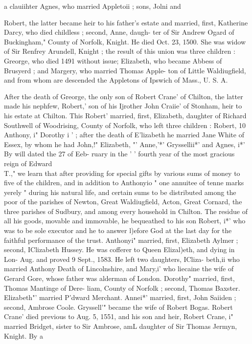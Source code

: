 \documentclass[oneside]{book}
\begin{document}
a clauiihter Agnes, who married Appletoii ; sons, Jolni and 

Robert, the latter became heir to his father's estate and married, 
first, Katherine Darcy, who died childless ; second, Anne, daugh- 
ter of Sir Andrew Ogard of Buckingham," County of Norfolk, 
Knight. He died Oct. 23, 1500. She was widow of Sir Renfrey 
Arundell, Knight ; the result of this union was three children : 
Greorge, who died 1491 without issue; Elizabeth, who became 
Abbess of Brusyerd ; and Margery, who married Thomas Apple- 
ton of Little Waldiugfield, and from whom are descended the 
Appletons of Ipswich of Mass., U. S. A. 

After the death of Greorge, the only son of Robert Crane' of 
Chilton, the latter made his nephfew, Robert,' son of his Ijrother 
John Craiie' of Stonham, heir to his estate at Chilton. This 
Robert' married, first, Elizabeth, daughter of Richard Southwell 
of Woodrising, County of Norfolk, who left three children : 
Robert, 10 Anthony, i" Dorothy i ' ; after the death of E'lizabeth he 
married Jane White of Essex, by whom he had John,!" Elizabeth, "' 
Anne,'*' Gryssellii*' and Agnes, i*' By will dated the 27 of Eeb- 
ruary in the ' ' fourth year of the most gracious reign of Edward 
\\T.," we learn that after providing for special gifts by various 
sums of money to five of the children, and in addition to Anthonyio 
" one annuitee of tenne marks yerely " during his natural life, and 
certain sums to be distributed among the poor of the parishes of 
Newton, Great Waldiugfield, Acton, Great Cornard, the three 
parishes of Sudbury, and among every household in Chilton. The 
residue of all his goods, movable and immovable, he bequeathed 
to his son Robert, i*' who was to be sole executor and he to answer 
l)efore God at the last day for the faithful performance of the trust. 
Anthonyi" married, first, Elizabeth Aylmer ; second, IClizabeth 
Hussey. He was cofferer to Queen Elizal)eth, and dying in Lon- 
Aug. and proved 9 Sept., 1583. He left two daughters, ICliza- 
beth,ii who married Anthony Death of Lincolnshire, and Mary,i' 
who liecaine the wife of Gerard Gore, whose father was alderman 
of London. Dorothy" married, first, Thomas Mantinge of Dere- 
liam, County of Norfolk ; second, Thomas Baxster. Elizabeth"' 
married P'dward Merchant. Annei*' married, first, John Saiiden ; 
second, Ambrose Coole. Gryssell'" became the wife of Robert 
Bogas. Robert Crane' died previous to Aug. 5, 1551, and his 
son and heir, Robert Crane, i" married Bridget, sister to Sir 
Ambrose, amL daughter of Sir Thomas Jermyn, Knight. By a 
\end{document}
